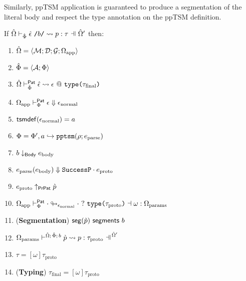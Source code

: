 Similarly, ppTSM application is guaranteed to produce a segmentation of the literal body and respect the type annotation on the ppTSM definition.
\begingroup
\def\thetheorem{\ref{thm:pptsm-reasoning-principles}}
\begin{theorem}
If $\patExpandsP{\uOmega'}{\uPhi}{\utsmap{\uepsilon}{b}}{p}{\tau}$ then:
\begin{enumerate}
  \item ${\hat\Omega}=\langle \mathcal{M}; \mathcal{D}; \mathcal{G}; \Omega_\text{app} \rangle$
  \item $\hat\Phi=\langle \mathcal{A}; \Phi \rangle$
  \item ${\hat\Omega} \vdash_{\hat\Phi}^{\mathsf{Pat}} {\hat\epsilon} \leadsto \epsilon~@~\texttt{type}\texttt{(}\tau_\text{final}\texttt{)}$
  \item $\Omega_\text{app} \vdash_{\Phi}^\mathsf{Pat} \epsilon \Downarrow \epsilon_\text{normal}$
  \item $\mathsf{tsmdef}(\epsilon_\text{normal})=a$
  \item $\Phi = \Phi', a \hookrightarrow \texttt{pptsm}(\rho; e_\text{parse})$
  \item $b \downarrow_\mathsf{Body} e_\text{body}$
  \item $e_\text{parse}(e_\text{body}) \Downarrow {\mathtt{SuccessP}}\cdot{e_\text{proto}}$
  \item $e_\text{proto} \uparrow_\mathsf{PrPat} \grave{p}$
  \item $\Omega_\text{app} \vdash_{\Phi}^\mathsf{Pat} \cdot \looparrowright_{\epsilon_\text{normal}} \cdot ~?~ \texttt{type}\texttt{(}\tau_\text{proto}\texttt{)} \dashv \omega : \Omega_\text{params}$
  \item (\textbf{Segmentation}) $\mathsf{seg}(\grave{p})~\mathsf{segments}~b$
  \item $\cvalidPP{\uOmega'}{\psceneP{\uOmega}{\uPhi}{b}}{\cpv}{p}{\tau_\text{proto}}$
  \item $\tau = [\omega]\tau_\text{proto}$
  \item (\textbf{Typing}) $\tau_\text{final} = [\omega]\tau_\text{proto}$
\end{enumerate}
\end{theorem}
\endgroup

